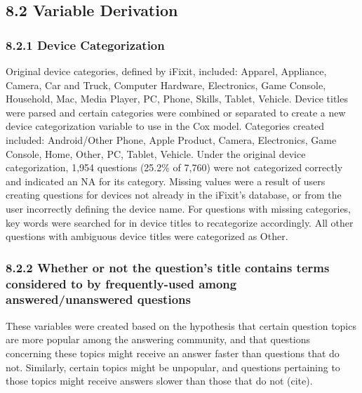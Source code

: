 \documentclass{article}
\begin{document}

\subsection*{8.2 Variable Derivation}

\subsubsection*{8.2.1 Device Categorization}

Original device categories, defined by iFixit, included: Apparel, Appliance, Camera, Car and Truck, Computer Hardware, Electronics, Game Console, Household, Mac, Media Player, PC, Phone, Skills, Tablet, Vehicle. Device titles were parsed and certain categories were combined or separated to create a new device categorization variable to use in the Cox model. Categories created included: Android/Other Phone, Apple Product, Camera, Electronics, Game Console, Home, Other, PC, Tablet, Vehicle. Under the original device categorization, 1,954 questions (25.2\% of 7,760) were not categorized correctly and indicated an NA for its category. Missing values were a result of users creating questions for devices not already in the iFixit's database, or from the user incorrectly defining the device name. For questions with missing categories, key words were searched for in device titles to recategorize accordingly. All other questions with ambiguous device titles were categorized as Other. 

\subsubsection*{8.2.2 Whether or not the question's title contains terms considered to by frequently-used among answered/unanswered questions}

These variables were created based on the hypothesis that certain question topics are more popular among the answering community, and that questions concerning these topics might receive an answer faster than questions that do not. Similarly, certain topics might be unpopular, and questions pertaining to those topics might receive answers slower than those that do not (cite).
\end{document}
